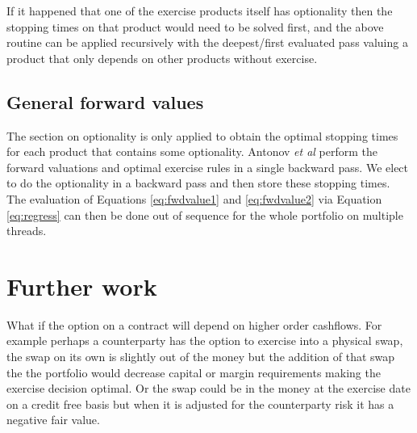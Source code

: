 \documentclass[a4paper,10pt]{article}
\begin{document}
If it happened that one of the exercise products itself has optionality then the stopping times on that product would need to be solved first, and the above routine can be applied recursively with the deepest/first evaluated pass valuing a product that only depends on other products without exercise.

\subsection{General forward values}
The section on optionality is only applied to obtain the optimal stopping times for each product that contains some optionality.  Antonov \textit{et al} \cite{AntonovEtAl2015} perform the forward valuations and optimal exercise rules in a single backward pass.  We elect to do the optionality in a backward pass and then store these stopping times.  The evaluation of Equations \ref{eq:fwdvalue1} and \ref{eq:fwdvalue2} via Equation \ref{eq:regress} can then be done out of sequence for the whole portfolio on multiple threads.


\section{Further work}
What if the option on a contract will depend on higher order cashflows.  For example perhaps a counterparty has the option to exercise into a physical swap, the swap on its own is slightly out of the money but the addition of that swap the the portfolio would decrease capital or margin requirements making the exercise decision optimal.  Or the swap could be in the money at the exercise date on a credit free basis but when it is adjusted for the counterparty risk it has a negative fair value.




\end{document}
